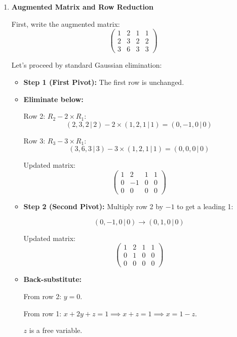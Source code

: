 \documentclass[12pt]{article}
\theoremstyle{definition}
\theoremstyle{plain}
\begin{document}
\begin{enumerate}[label=(\alph*)]
\item \textbf{Augmented Matrix and Row Reduction}

First, write the augmented matrix:
\[
\left(
\begin{array}{ccc|c}
1 & 2 & 1 & 1 \\
2 & 3 & 2 & 2 \\
3 & 6 & 3 & 3
\end{array}
\right)
\]

Let's proceed by standard Gaussian elimination:

\begin{itemize}
    \item \textbf{Step 1 (First Pivot):} The first row is unchanged.

    \item \textbf{Eliminate below:}

    Row 2: \( R_2 - 2 \times R_1 \):
    \[
    (2, 3, 2\,|\,2) - 2 \times (1, 2, 1\,|\,1) = (0, -1, 0\,|\,0)
    \]

    Row 3: \( R_3 - 3 \times R_1 \):
    \[
    (3, 6, 3\,|\,3) - 3 \times (1, 2, 1\,|\,1) = (0, 0, 0\,|\,0)
    \]

    Updated matrix:
    \[
    \left(
    \begin{array}{ccc|c}
    1 & 2 & 1 & 1 \\
    0 & -1 & 0 & 0 \\
    0 & 0 & 0 & 0
    \end{array}
    \right)
    \]

    \item \textbf{Step 2 (Second Pivot):}
    Multiply row 2 by \(-1\) to get a leading 1:

    \[
    (0, -1, 0\,|\,0) \to (0, 1, 0\,|\,0)
    \]

    Updated matrix:
    \[
    \left(
    \begin{array}{ccc|c}
    1 & 2 & 1 & 1 \\
    0 & 1 & 0 & 0 \\
    0 & 0 & 0 & 0
    \end{array}
    \right)
    \]

    \item \textbf{Back-substitute:} 

    From row 2: \( y = 0 \).

    From row 1: \( x + 2y + z = 1 \implies x + z = 1 \implies x = 1 - z \).

    \( z \) is a free variable.
\end{itemize}


\end{enumerate}
\end{document}
